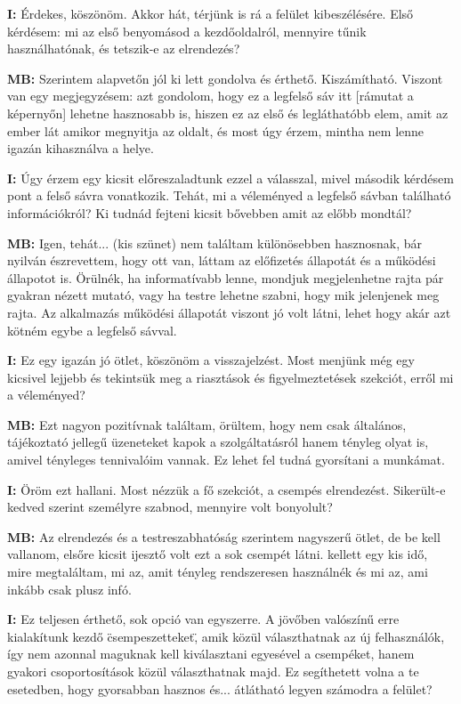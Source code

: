 \documentclass{imc-inf}
\begin{document}
\begin{appendices}
  \noindent\textbf{I:} Érdekes, köszönöm. Akkor hát, térjünk is rá a felület kibeszélésére. Első kérdésem: mi az első benyomásod a kezdőoldalról, mennyire tűnik használhatónak, és tetszik-e az elrendezés?

  \noindent\textbf{MB:} Szerintem alapvetőn jól ki lett gondolva és érthető. Kiszámítható. Viszont van egy megjegyzésem: azt gondolom, hogy ez a legfelső sáv itt [rámutat a képernyőn] lehetne hasznosabb is, hiszen ez az első és legláthatóbb elem, amit az ember lát amikor megnyitja az oldalt, és most úgy érzem, mintha nem lenne igazán kihasználva a helye.

  \noindent\textbf{I:} Úgy érzem egy kicsit előreszaladtunk ezzel a válasszal, mivel második kérdésem pont a felső sávra vonatkozik. Tehát, mi a véleményed a legfelső sávban található információkról? Ki tudnád fejteni kicsit bővebben amit az előbb mondtál?

  \noindent\textbf{MB:} Igen, tehát... (kis szünet) nem találtam különösebben hasznosnak, bár nyilván észrevettem, hogy ott van, láttam az előfizetés állapotát és a működési állapotot is. Örülnék, ha informatívabb lenne, mondjuk megjelenhetne rajta pár gyakran nézett mutató, vagy ha testre lehetne szabni, hogy mik jelenjenek meg rajta. Az alkalmazás működési állapotát viszont jó volt látni, lehet hogy akár azt kötném egybe a legfelső sávval.

  \noindent\textbf{I:} Ez egy igazán jó ötlet, köszönöm a visszajelzést. Most menjünk még egy kicsivel lejjebb és tekintsük meg a riasztások és figyelmeztetések szekciót, erről mi a véleményed?

  \noindent\textbf{MB:} Ezt nagyon pozitívnak találtam, örültem, hogy nem csak általános, tájékoztató jellegű üzeneteket kapok a szolgáltatásról hanem tényleg olyat is, amivel tényleges tennivalóim vannak. Ez lehet fel tudná gyorsítani a munkámat.

  \noindent\textbf{I:} Öröm ezt hallani. Most nézzük a fő szekciót, a csempés elrendezést. Sikerült-e kedved szerint személyre szabnod, mennyire volt bonyolult?

  \noindent\textbf{MB:} Az elrendezés és a testreszabhatóság szerintem nagyszerű ötlet, de be kell vallanom, elsőre kicsit ijesztő volt ezt a sok csempét látni. kellett egy kis idő, mire megtaláltam, mi az, amit tényleg rendszeresen használnék és mi az, ami inkább csak plusz infó.

  \noindent\textbf{I:} Ez teljesen érthető, sok opció van egyszerre. A jövőben valószínű erre kialakítunk kezdő \"csempeszetteket\", amik közül választhatnak az új felhasználók, így nem azonnal maguknak kell kiválasztani egyesével a csempéket, hanem gyakori csoportosítások közül választhatnak majd. Ez segíthetett volna a te esetedben, hogy gyorsabban hasznos és... átlátható legyen számodra a felület?


\end{appendices}
\end{document}
